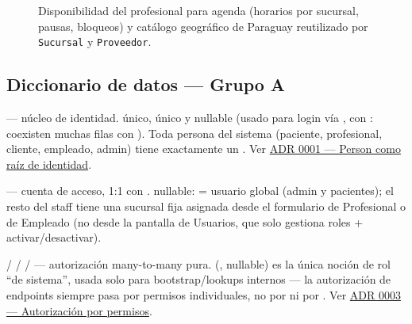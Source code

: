 \begin{figure}[htbp]
\caption{Disponibilidad del profesional para agenda (horarios por sucursal, pausas, bloqueos) y catálogo geográfico de Paraguay reutilizado por \texttt{Sucursal} y \texttt{Proveedor}.}
\label{fig:er-personal-sucursales}
\end{figure}

\subsection{Diccionario de datos --- Grupo A}
\label{sec:diccionario-grupo-a}

 --- núcleo de identidad.  único,  único y nullable (usado para login vía , con \allowbreak {}\allowbreak {}: coexisten muchas filas con ). Toda persona del sistema (paciente, profesional, cliente, empleado, admin) tiene exactamente un . Ver \hyperref[adr:0001]{ADR 0001 --- Person como raíz de identidad}.

 --- cuenta de acceso, 1:1 con .  nullable:  = usuario global (admin y pacientes); el resto del staff tiene una sucursal fija asignada desde el formulario de Profesional o de Empleado (no desde la pantalla de Usuarios, que solo gestiona roles + activar/desactivar).

 /  /  /  --- autorización many-to-many pura.  (\textbar{}\textbar{}, nullable) es la única noción de rol ``de sistema'', usada solo para bootstrap/lookups internos --- la autorización de endpoints siempre pasa por permisos individuales, no por  ni por . Ver \hyperref[adr:0003]{ADR 0003 --- Autorización por permisos}.

